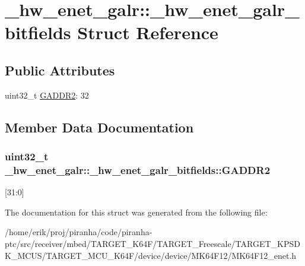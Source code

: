 \hypertarget{struct__hw__enet__galr_1_1__hw__enet__galr__bitfields}{}\section{\+\_\+hw\+\_\+enet\+\_\+galr\+:\+:\+\_\+hw\+\_\+enet\+\_\+galr\+\_\+bitfields Struct Reference}
\label{struct__hw__enet__galr_1_1__hw__enet__galr__bitfields}
\subsection*{Public Attributes}
\begin{DoxyCompactItemize}
\item 
uint32\+\_\+t \hyperlink{struct__hw__enet__galr_1_1__hw__enet__galr__bitfields_a5661e312f5f50a18fcc421b6d055b5e1}{G\+A\+D\+D\+R2}\+: 32
\end{DoxyCompactItemize}


\subsection{Member Data Documentation}
\subsubsection[{\texorpdfstring{G\+A\+D\+D\+R2}{GADDR2}}]{\setlength{\rightskip}{0pt plus 5cm}uint32\+\_\+t \+\_\+hw\+\_\+enet\+\_\+galr\+::\+\_\+hw\+\_\+enet\+\_\+galr\+\_\+bitfields\+::\+G\+A\+D\+D\+R2}\hypertarget{struct__hw__enet__galr_1_1__hw__enet__galr__bitfields_a5661e312f5f50a18fcc421b6d055b5e1}{}\label{struct__hw__enet__galr_1_1__hw__enet__galr__bitfields_a5661e312f5f50a18fcc421b6d055b5e1}
\mbox{[}31\+:0\mbox{]} 

The documentation for this struct was generated from the following file\+:\begin{DoxyCompactItemize}
\item 
/home/erik/proj/piranha/code/piranha-\/ptc/src/receiver/mbed/\+T\+A\+R\+G\+E\+T\+\_\+\+K64\+F/\+T\+A\+R\+G\+E\+T\+\_\+\+Freescale/\+T\+A\+R\+G\+E\+T\+\_\+\+K\+P\+S\+D\+K\+\_\+\+M\+C\+U\+S/\+T\+A\+R\+G\+E\+T\+\_\+\+M\+C\+U\+\_\+\+K64\+F/device/device/\+M\+K64\+F12/M\+K64\+F12\+\_\+enet.\+h\end{DoxyCompactItemize}
